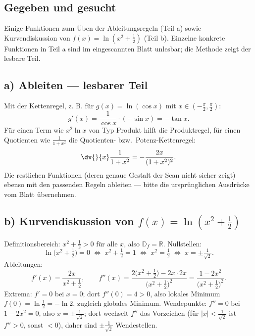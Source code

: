 
\subsection*{Gegeben und gesucht}
Einige Funktionen zum Üben der Ableitungsregeln (Teil a) sowie Kurvendiskussion
von $f(x)=\ln(x^2+\tfrac12)$ (Teil b). Einzelne konkrete Funktionen in Teil a
sind im eingescannten Blatt unlesbar; die Methode zeigt der lesbare Teil.

\subsection*{a) Ableiten — lesbarer Teil}
Mit der Kettenregel, z. B. für $g(x)=\ln(\cos x)$ mit $x\in(-\tfrac\pi2,\tfrac\pi2)$:
\begin{equation}
  g'(x)=\frac{1}{\cos x}\cdot(-\sin x)=-\tan x.
\end{equation}
Für einen Term wie $x^2\ln x$ von Typ Produkt hilft die Produktregel, für einen
Quotienten wie $\frac{1}{1+x^2}$ die Quotienten- bzw.\ Potenz-Kettenregel:
\begin{equation}
  \dv{}{x}\frac{1}{1+x^2}=-\frac{2x}{(1+x^2)^2}.
\end{equation}
Die restlichen Funktionen (deren genaue Gestalt der Scan nicht sicher zeigt)
ebenso mit den passenden Regeln ableiten — bitte die ursprünglichen Ausdrücke
vom Blatt übernehmen.

\subsection*{b) Kurvendiskussion von $f(x)=\ln(x^2+\tfrac12)$}
Definitionsbereich: $x^2+\tfrac12>0$ für alle $x$, also $\mathbb D_f=\mathbb R$.
Nullstellen:
\begin{equation}
  \ln\!\bigl(x^2+\tfrac12\bigr)=0
  \;\Longleftrightarrow\; x^2+\tfrac12=1
  \;\Longleftrightarrow\; x^2=\tfrac12
  \;\Longleftrightarrow\; x=\pm\tfrac{1}{\sqrt2}.
\end{equation}
Ableitungen:
\begin{equation}
  f'(x)=\frac{2x}{x^2+\tfrac12},\qquad
  f''(x)=\frac{2\bigl(x^2+\tfrac12\bigr)-2x\cdot2x}{\bigl(x^2+\tfrac12\bigr)^2}
  =\frac{1-2x^2}{\bigl(x^2+\tfrac12\bigr)^2}.
\end{equation}
Extrema: $f'=0$ bei $x=0$; dort $f''(0)=4>0$, also lokales Minimum
$f(0)=\ln\tfrac12=-\ln2$, zugleich globales Minimum. Wendepunkte: $f''=0$ bei
$1-2x^2=0$, also $x=\pm\tfrac{1}{\sqrt2}$; dort wechselt $f''$ das Vorzeichen
(für $|x|<\tfrac1{\sqrt2}$ ist $f''>0$, sonst $<0$), daher sind
$\pm\tfrac1{\sqrt2}$ Wendestellen.

